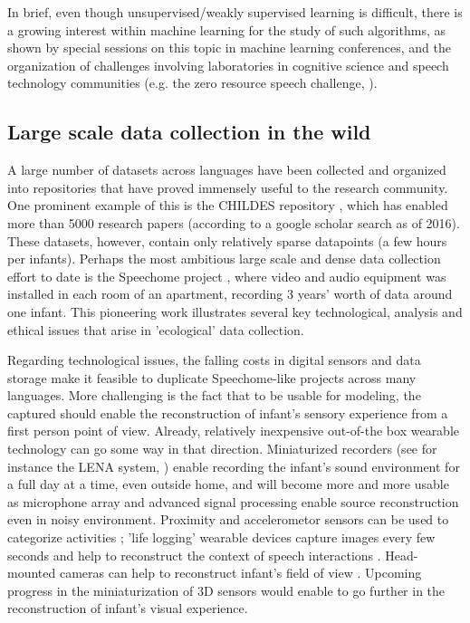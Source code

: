 \documentclass[jou,apacite]{apa6}
\begin{document}
In brief, even though unsupervised/weakly supervised learning is difficult, there is a growing interest within machine learning for the study of such algorithms, as shown by special sessions on this topic in machine learning conferences, and the organization of challenges involving laboratories in cognitive science and speech technology communities (e.g. the zero resource speech challenge, ). 



\subsection{Large scale data collection in the wild}\label{section:privacy}


A large number of datasets across languages have been collected and organized into repositories that have proved immensely useful to the research community. One prominent example of this is the CHILDES repository \cite{macwhinney2000childes}, which has enabled more than 5000 research papers (according to a google scholar search as of 2016). These datasets, however, contain only relatively sparse datapoints (a few hours per infants).
Perhaps the most ambitious large scale and dense data collection effort to date is the Speechome project \cite{roy_2009}, where video and audio equipment was installed in each room of an apartment, recording 3 years' worth of data around one infant. This pioneering work illustrates several key technological, analysis and ethical issues that arise in 'ecological' data collection.








Regarding technological issues, the falling costs in digital sensors and data storage make it feasible to duplicate Speechome-like projects across many languages. More challenging is the fact that to be usable for modeling, the captured should enable the reconstruction of infant's sensory experience from a first person point of view.  Already, relatively inexpensive out-of-the box wearable technology can go some way in that direction. Miniaturized recorders (see for instance the LENA system, ) enable recording the infant's sound environment for a full day at a time, even outside  home, and will become more and more usable as microphone array and advanced signal processing enable source reconstruction even in noisy environment. Proximity and accelerometor sensors can be used to categorize activities \cite{sangwan_2015}; 'life logging' wearable devices capture images every few seconds and help to reconstruct the context of speech interactions \cite{casillas_2016}. Head-mounted cameras can help to reconstruct infant's field of view \cite{smith_2015}.  Upcoming progress in the miniaturization of 3D sensors would enable to go further in the reconstruction of infant's visual experience.  %
\end{document}
